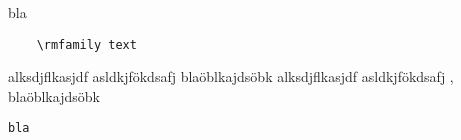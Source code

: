 
bla

\begin{verbatim}
	\rmfamily text
\end{verbatim}
 
 
 alksdjflkasjdf asldkjfökdsafj \mfg blaöblkajdsöbk
 alksdjflkasjdf asldkjfökdsafj \mfg, blaöblkajdsöbk

\verb|bla|


